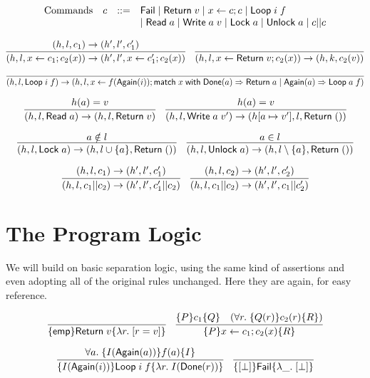 \documentclass{amsbook}
\theoremstyle{definition}
\theoremstyle{remark}
\numberwithin{section}{chapter}
\numberwithin{equation}{chapter}
\begin{document}
$$\begin{array}{rrcl}
  \textrm{Commands} & c &::=& \mathsf{Fail} \mid \mathsf{Return} \; v \mid x \leftarrow c; c \mid \mathsf{Loop} \; i \; f \\
  &&& \mid \mathsf{Read} \; a \mid \mathsf{Write} \; a \; v \mid \mathsf{Lock} \; a \mid \mathsf{Unlock} \; a \mid c || c
\end{array}$$

$$\infer{\smallstep{(h, l, x \leftarrow c_1; c_2(x))}{(h', l', x \leftarrow c'_1; c_2(x))}}{
  \smallstep{(h, l, c_1)}{(h', l', c'_1)}
}
\quad \infer{\smallstep{(h, l, x \leftarrow \mt{Return} \; v; c_2(x))}{(h, k, c_2(v))}}{}$$

$$\infer{\smallstep{(h, l, \mt{Loop} \; i \; f)}{(h, l, x \leftarrow f(\mt{Again}(i)); \mt{match} \; x \; \mt{with} \; \mt{Done}(a) \Rightarrow \mt{Return} \; a \mid \mt{Again}(a) \Rightarrow \mt{Loop} \; a \; f)}}{}$$

$$\infer{\smallstep{(h, l, \mt{Read} \; a)}{(h, l, \mt{Return} \; v)}}{
  \msel{h}{a} = v
}
\quad \infer{\smallstep{(h, l, \mt{Write} \; a \; v')}{(\mupd{h}{a}{v'}, l, \mt{Return} \; ())}}{
  \msel{h}{a} = v
}$$

$$\infer{\smallstep{(h, l, \mt{Lock} \; a)}{(h, l \cup \{a\}, \mt{Return} \; ())}}{
  a \notin l
}
\quad \infer{\smallstep{(h, l, \mt{Unlock} \; a)}{(h, l \setminus \{a\}, \mt{Return} \; ())}}{
  a \in l
}$$

$$\infer{\smallstep{(h, l, c_1 || c_2)}{(h', l', c'_1 || c_2)}}{
  \smallstep{(h, l, c_1)}{(h', l', c'_1)}
}
\quad \infer{\smallstep{(h, l, c_1 || c_2)}{(h', l', c_1 || c'_2)}}{
  \smallstep{(h, l, c_2)}{(h', l', c'_2)}
}$$


\section{The Program Logic}

We will build on basic separation logic, using the same kind of assertions and even adopting all of the original rules unchanged.
Here they are again, for easy reference.

$$\infer{\hoare{\emp}{\mt{Return} \; v}{\lambda r. \; \lift{r = v}}}{}
\quad \infer{\hoare{P}{x \leftarrow c_1; c_2(x)}{R}}{
  \hoare{P}{c_1}{Q}
  & (\forall r. \; \hoare{Q(r)}{c_2(r)}{R})
}$$

$$\infer{\hoare{I(\mt{Again}(i))}{\mt{Loop} \; i \; f}{\lambda r. \; I(\mt{Done}(r))}}{
  \forall a. \; \hoare{I(\mt{Again}(a))}{f(a)}{I}
}
\quad \infer{\hoare{\lift{\bot}}{\mt{Fail}}{\lambda \_. \; \lift{\bot}}}{}$$
\end{document}
